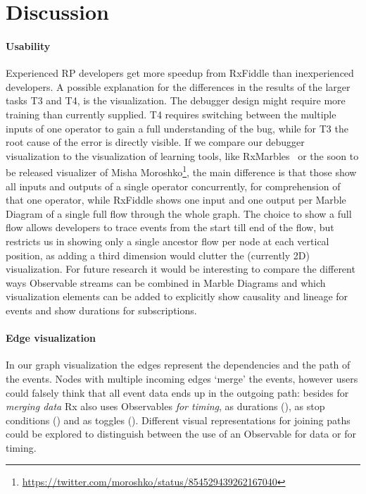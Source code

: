 \section{Discussion}
\paragraph{Usability}
Experienced RP developers get more speedup from RxFiddle than inexperienced developers. A possible explanation for the differences in the results of the larger tasks T3 and T4, is the visualization. The debugger design might require more training than currently supplied. T4 requires switching between the multiple inputs of one operator to gain a full understanding of the bug, while for T3 the root cause of the error is directly visible. If we compare our debugger visualization to the visualization of learning tools, like RxMarbles~\cite{rxmarbles} or the soon to be released visualizer of Misha Moroshko\footnote{\url{https://twitter.com/moroshko/status/854529439262167040}}, the main difference is that those show all inputs and outputs of a single operator concurrently, for comprehension of that one operator, while RxFiddle shows one input and one output per Marble Diagram of a single full flow through the whole graph. The choice to show a full flow allows developers to trace events from the start till end of the flow, but restricts us in showing only a single ancestor flow per node at each vertical position, as adding a third dimension would clutter the (currently 2D) visualization. For future research it would be interesting to compare the different ways Observable streams can be combined in Marble Diagrams and which visualization elements can be added to explicitly show causality and lineage for events and show durations for subscriptions.

\paragraph{Edge visualization}
In our graph visualization the edges represent the dependencies and the path of the events. Nodes with multiple incoming edges `merge' the events, however users could falsely think that all event data ends up in the outgoing path: besides for \textit{merging data} Rx also uses Observables \textit{for timing}, as durations (), as stop conditions () and as toggles (). Different visual representations for joining paths could be explored to distinguish between the use of an Observable for data or for timing.
